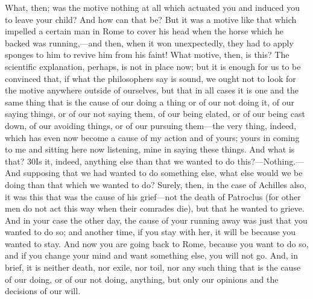 What, then; was the motive nothing at all which actuated you and induced you to leave your child? And how can that be? But it was a motive like that which impelled a certain man in Rome to cover his head when the horse which he backed was running,—and then, when it won unexpectedly, they had to apply sponges to him to revive him from his faint! What motive, then, is this? The scientific explanation, perhaps, is not in place now; but it is enough for us to be convinced that, if what the philosophers say is sound, we ought not to look for the motive anywhere outside of ourselves, but that in all cases it is one and the same thing that is the cause of our doing a thing or of our not doing it, of our saying things, or of our not saying them, of our being elated, or of our being cast down, of our avoiding things, or of our pursuing them—the very thing, indeed, which has even now become a cause of my action and of yours; yours in coming to me and sitting here now listening, mine in saying these things. And what is that? 30Is it, indeed, anything else than that we wanted to do this?—Nothing.—And supposing that we had wanted to do something else, what else would we be doing than that which we wanted to do? Surely, then, in the case of Achilles also, it was this that was the cause of his grief—not the death of Patroclus (for other men do not act this way when their comrades die), but that he wanted to grieve. And in your case the other day, the cause of your running away was just that you wanted to do so; and another time, if you stay with her, it will be because you wanted to stay. And now you are going back to Rome, because you want to do so, and if you change your mind and want something else, you will not go. And, in brief, it is neither death, nor exile, nor toil, nor any such thing that is the cause of our doing, or of our not doing, anything, but only our opinions and the decisions of our will.

